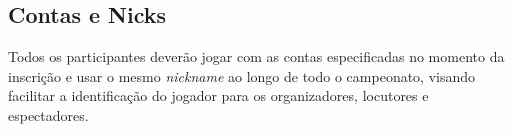 \subsection{Contas e Nicks}

Todos os participantes deverão jogar com as contas especificadas no momento da inscrição e usar o mesmo \textit{nickname} ao longo de todo o campeonato, visando facilitar a identificação do jogador para os organizadores, locutores e espectadores.